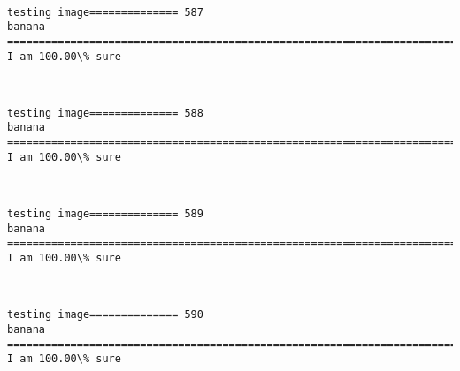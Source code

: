 \documentclass[11pt]{article}
\begin{document}
    \begin{center}
    \end{center}
    { \hspace*{\fill} \\}
    
    \begin{Verbatim}[commandchars=\\\{\}]
testing image============== 587
banana
============================================================================
I am 100.00\% sure

    \end{Verbatim}

    \begin{center}
    \end{center}
    { \hspace*{\fill} \\}
    
    \begin{Verbatim}[commandchars=\\\{\}]
testing image============== 588
banana
============================================================================
I am 100.00\% sure

    \end{Verbatim}

    \begin{center}
    \end{center}
    { \hspace*{\fill} \\}
    
    \begin{Verbatim}[commandchars=\\\{\}]
testing image============== 589
banana
============================================================================
I am 100.00\% sure

    \end{Verbatim}

    \begin{center}
    \end{center}
    { \hspace*{\fill} \\}
    
    \begin{Verbatim}[commandchars=\\\{\}]
testing image============== 590
banana
============================================================================
I am 100.00\% sure

    \end{Verbatim}
\end{document}
